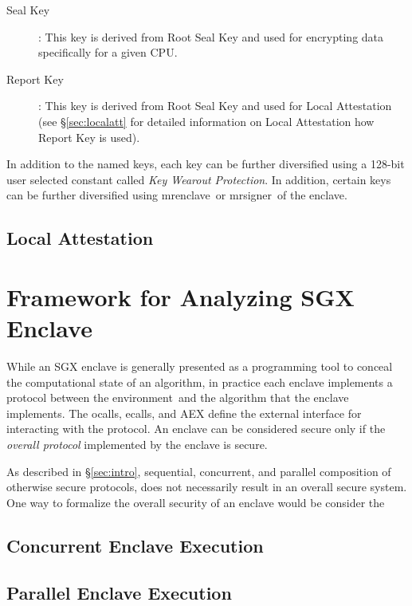 \documentclass[10pt]{article}
\newcommand{\secref}[1]{\S\ref{#1}}
\newcommand{\ecall}{\textsf{ecall}}
\newcommand{\ocall}{\textsf{ocall}}
\newcommand{\env}{\textsf{environment}}
\newcommand{\mrenclave}{\textsf{mrenclave}}
\newcommand{\mrsigner}{\textsf{mrsigner}}
\begin{document}
\begin{description}
  \item[Seal Key]: This key is derived from Root Seal Key and used
    for encrypting data specifically for a given CPU.

  \item[Report Key]: This key is derived from Root Seal Key and used
    for Local Attestation (see \secref{sec:localatt} for detailed
    information on Local Attestation how Report Key is used).
  \end{description}

  In addition to the named keys, each key can be further diversified
  using a 128-bit user selected constant called \textit{Key Wearout
    Protection}.  In addition, certain keys can be further diversified
  using \mrenclave\ or \mrsigner\ of the enclave.

  \subsection{Local Attestation}
  \label{ssec:localatt}

  \section{Framework for Analyzing SGX Enclave}
  \label{sec:analysisfwk}

  While an SGX enclave is generally presented as a programming tool to
  conceal the computational state of an algorithm, in practice each
  enclave implements a protocol between the \env\ and the algorithm
  that the enclave implements. The \ocall s, \ecall s, and AEX define
  the external interface for interacting with the protocol. An enclave
  can be considered secure only if the \textit{overall protocol}
  implemented by the enclave is secure.

  As described in \secref{sec:intro}, sequential, concurrent, and
  parallel composition of otherwise secure protocols, does not
  necessarily result in an overall secure system. One way to formalize
  the overall security of an enclave would be consider the

  \subsection{Concurrent Enclave Execution}
  \label{ssec:concexec}

  \subsection{Parallel Enclave Execution}
  \label{ssec:parallelexec}
\end{document}
